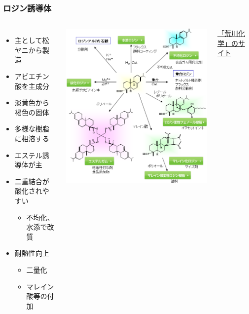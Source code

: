 \documentclass[12pt, dvipdfmx]{beamer}
\begin{document}
\begin{frame}
	\frametitle{ロジン誘導体}
		\begin{columns}[c, onlytextwidth]
				\begin{itemize}
					\item 主として松ヤニから製造
					\item アビエチン酸を主成分
					\item 淡黄色から褐色の固体
					\item 多様な樹脂に相溶する
					\item エステル誘導体が主
					\item 二重結合が酸化されやすい
					\begin{itemize}
						\item 不均化、水添で改質
					\end{itemize}
					\item 耐熱性向上
					\begin{itemize}
						\item 二量化
						\item マレイン酸等の付加
					\end{itemize}
				\end{itemize}
				\centering
				\includegraphics[width=\textwidth]{tackifier_rosin.png}

				\href{https://www.arakawachem.co.jp/jp/technology/catalog/02.html}{「荒川化学」のサイト}
		\end{columns}

\end{frame}
\end{document}
